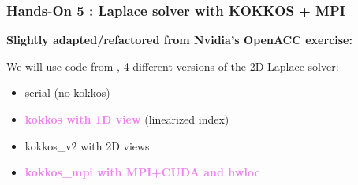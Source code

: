 \begin{frame}
  \frametitle{Hands-On 5 : Laplace solver with KOKKOS + MPI}

  \textbf{Slightly adapted/refactored from Nvidia's OpenACC exercise:}\\

  We will use code from , 4 different versions of the 2D Laplace solver:
  \begin{itemize}
  \item serial (no kokkos)
  \item \textcolor{violet}{\bf kokkos with 1D view} (linearized index)
  \item kokkos\_v2 with 2D views
  \item \textcolor{violet}{\bf kokkos\_mpi with MPI+CUDA and hwloc}
  \end{itemize}
  
\end{frame}
